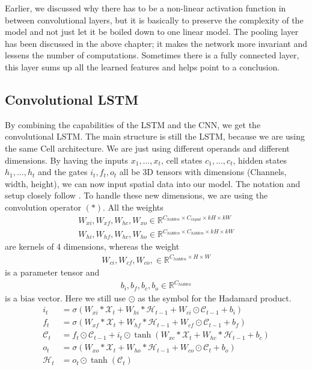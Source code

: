\documentclass[a4paper,12pt]{article}
\begin{document}
Earlier, we discussed why there has to be a non-linear activation function in between convolutional layers, but it is basically to preserve the complexity of the model and not just let it be boiled down to one linear model.
The pooling layer has been discussed in the above chapter; it makes the network more invariant and lessens the number of computations. Sometimes there is a fully connected layer, this layer sums up all the learned features and helps point to a conclusion.


\subsection{Convolutional LSTM}
By combining the capabilities of the LSTM and the CNN, we get the convolutional LSTM. The main structure is still the LSTM, because we are using the same Cell architecture. We are just using different operands and different dimensions. By having the inputs $x_1, \dots, x_t$, cell states $c_1,\dots, c_t$, hidden states $h_1, \dots, h_t$ and the gates $i_t, f_t, o_t$ all be 3D tensors with dimensions (Channels, width, height), we can now input spatial data into our model.
The notation and setup closely follow \cite{Shi2015ConvolutionalLN}.
To handle these new dimensions, we are using the convolution operator $(*)$. All the weights
\begin{align*}
W_{xi}, W_{xf}, W_{hc}, W_{xo} \in \mathbb{R}^{C_{hidden} \times C_{input} \times kH \times kW}\\
W_{hi}, W_{hf}, W_{hc}, W_{ho} \in \mathbb{R}^{C_{hidden} \times C_{hidden} \times kH \times kW}
\end{align*}
are kernels of 4 dimensions, whereas the weight
\begin{align*}
W_{ci}, W_{cf}, W_{co}, \in \mathbb{R}^{C_{hidden} \times H \times W}
\end{align*}
is a parameter tensor and
\begin{align*}
 b_i, b_f, b_c, b_o \in \mathbb{R}^{C_{hidden}}
\end{align*}
is a bias vector.
Here we still use $\odot$ as the symbol for the Hadamard product.
\begin{align}
i_t &= \sigma(W_{xi} * \mathcal{X}_t + W_{hi} * \mathcal{H}_{t-1} + W_{ci} \odot \mathcal{C}_{t-1} + b_i) \\
f_t &= \sigma(W_{xf} * \mathcal{X}_t + W_{hf} * \mathcal{H}_{t-1} + W_{cf} \odot \mathcal{C}_{t-1} + b_f) \\
\mathcal{C}_t &= f_t \odot \mathcal{C}_{t-1} + i_t \odot \tanh(W_{xc} * \mathcal{X}_t + W_{hc} * \mathcal{H}_{t-1} + b_c) \\
o_t &= \sigma(W_{xo} * \mathcal{X}_t + W_{ho} * \mathcal{H}_{t-1} + W_{co} \odot \mathcal{C}_t + b_o) \\
\mathcal{H}_t &= o_t \odot \tanh(\mathcal{C}_t)
\end{align}
\end{document}
